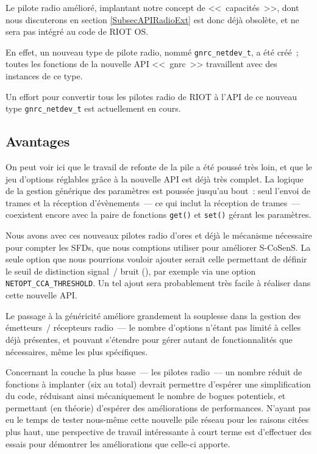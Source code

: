 \bigskip

Le pilote radio amélioré, implantant notre concept de <<~capacités~>>,
dont nous discuterons en section \vref{SubsecAPIRadioExt} est donc déjà
obsolète, et ne sera pas intégré au code de RIOT OS.

En effet, un nouveau type de pilote radio, nommé \texttt{gnrc\_netdev\_t},
a été créé~; toutes les fonctions de la nouvelle API <<~gnrc~>> travaillent
avec des instances de ce type.

Un effort pour convertir tous les pilotes radio de RIOT à l'API de ce
nouveau type \texttt{gnrc\_netdev\_t} est actuellement en cours.


\subsection{Avantages}
\label{SubsecAvantagesGnrc}

On peut voir ici que le travail de refonte de la pile a été poussé très
loin, et que le jeu d'options réglables grâce à la nouvelle API est déjà
très complet. La logique de la gestion générique des paramètres est poussée
jusqu'au bout~: seul l'envoi de trames et la réception d'évènements~---
ce qui inclut la réception de trames~--- coexistent encore avec la paire
de fonctions \texttt{get()} et \texttt{set()} gérant les paramètres.

Nous avons avec ces nouveaux pilotes radio d'ores et déjà le mécanisme
nécessaire pour compter les SFDs, que nous comptions utiliser pour améliorer
S-CoSenS. La seule option que nous pourrions vouloir ajouter serait celle
permettant de définir le seuil de distinction signal~/ bruit (), par exemple via une option \texttt{NETOPT\_CCA\_THRESHOLD}.
Un tel ajout sera probablement très facile à réaliser dans cette nouvelle
API.

Le passage à la généricité améliore grandement la souplesse dans la gestion
des émetteurs~/ récepteurs radio~--- le nombre d'options n'étant pas limité
à celles déjà présentes, et pouvant s'étendre pour gérer autant de
fonctionnalités que nécessaires, même les plus spécifiques.

Concernant la couche la plus basse~--- les pilotes radio~--- un nombre
réduit de fonctions à implanter (six au total) devrait permettre
d'espérer une simplification du code, réduisant ainsi mécaniquement 
le nombre de bogues potentiels, et permettant (en théorie) d'espérer des
améliorations de performances. N'ayant pas eu le temps de tester nous-même
cette nouvelle pile réseau pour les raisons citées plus haut, une perspective
de travail intéressante à court terme est d'effectuer des essais pour
démontrer les améliorations que celle-ci apporte.

